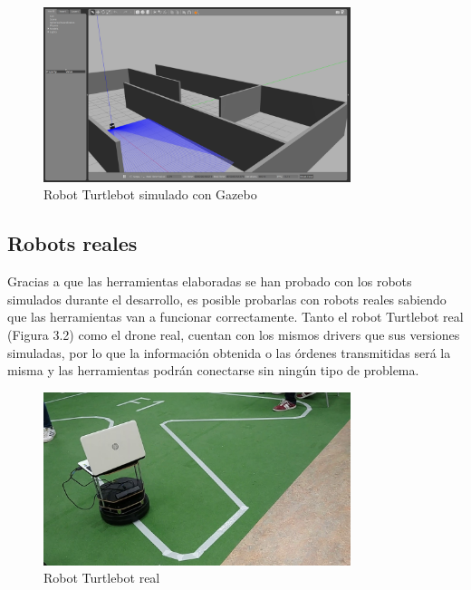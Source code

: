 \begin{figure}[H]
  \begin{center}
    \includegraphics[width=0.8\textwidth]{figures/gazeboturtle.png}
		\caption{Robot Turtlebot simulado con Gazebo}
		\label{fig.robotsimulado}
		\end{center}
\end{figure}

\subsection{Robots reales}
Gracias a que las herramientas elaboradas se han probado con los robots simulados durante el desarrollo, es posible probarlas con robots reales sabiendo que las herramientas van a funcionar correctamente. Tanto el robot Turtlebot real (Figura 3.2) como el drone real, cuentan con los mismos drivers que sus versiones simuladas, por lo que la información obtenida o las órdenes transmitidas será la misma y las herramientas podrán conectarse sin ningún tipo de problema.

\begin{figure}[H]
  \begin{center}
    \includegraphics[width=0.8\textwidth]{figures/turtlebotreal.jpg}
		\caption{Robot Turtlebot real}
		\label{fig.robotreal}
		\end{center}
\end{figure}


